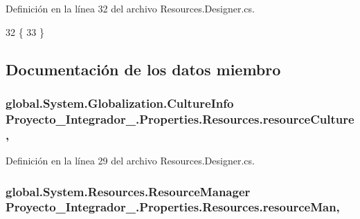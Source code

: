 Definición en la línea 32 del archivo Resources.\-Designer.\-cs.


\begin{DoxyCode}
32                              \{
33         \}
\end{DoxyCode}


\subsection{Documentación de los datos miembro}
\hypertarget{class_proyecto___integrador__3_1_1_properties_1_1_resources_a8af4e1b3b4391484a62aab436bb3a2fd}{
\subsubsection[{resource\-Culture}]{\setlength{\rightskip}{0pt plus 5cm}global.\-System.\-Globalization.\-Culture\-Info Proyecto\-\_\-\-Integrador\-\_.\-Properties.\-Resources.\-resource\-Culture\hspace{0.3cm}{\ttfamily [static]}, {\ttfamily [private]}}}\label{class_proyecto___integrador__3_1_1_properties_1_1_resources_a8af4e1b3b4391484a62aab436bb3a2fd}


Definición en la línea 29 del archivo Resources.\-Designer.\-cs.

\hypertarget{class_proyecto___integrador__3_1_1_properties_1_1_resources_a401c4979290f81446979a954753f0ccb}{
\subsubsection[{resource\-Man}]{\setlength{\rightskip}{0pt plus 5cm}global.\-System.\-Resources.\-Resource\-Manager Proyecto\-\_\-\-Integrador\-\_.\-Properties.\-Resources.\-resource\-Man\hspace{0.3cm}{\ttfamily [static]}, {\ttfamily [private]}}}\label{class_proyecto___integrador__3_1_1_properties_1_1_resources_a401c4979290f81446979a954753f0ccb}


